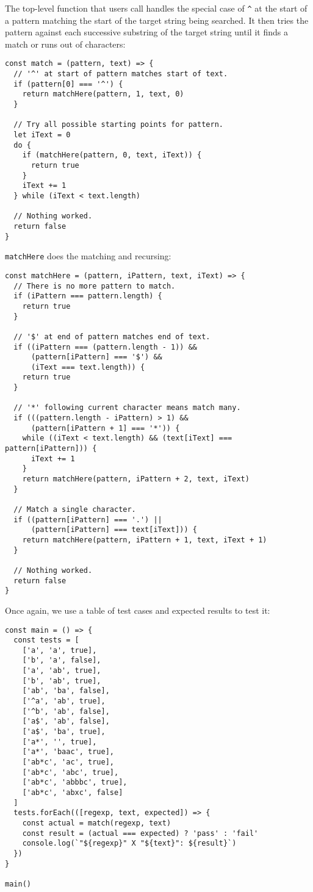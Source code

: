 \documentclass[krantzl]{krantz}
\begin{document}
The top-level function that users call
handles the special case of \texttt{{\textasciicircum}} at the start of a pattern
matching the start of the target string being searched.
It then tries the pattern against each successive substring of the target string
until it finds a match or runs out of characters:


\begin{lstlisting}[frame=tblr]
const match = (pattern, text) => {
  // '^' at start of pattern matches start of text.
  if (pattern[0] === '^') {
    return matchHere(pattern, 1, text, 0)
  }

  // Try all possible starting points for pattern.
  let iText = 0
  do {
    if (matchHere(pattern, 0, text, iText)) {
      return true
    }
    iText += 1
  } while (iText < text.length)

  // Nothing worked.
  return false
}
\end{lstlisting}



\texttt{matchHere} does the matching and recursing:


\begin{lstlisting}[frame=tblr]
const matchHere = (pattern, iPattern, text, iText) => {
  // There is no more pattern to match.
  if (iPattern === pattern.length) {
    return true
  }

  // '$' at end of pattern matches end of text.
  if ((iPattern === (pattern.length - 1)) &&
      (pattern[iPattern] === '$') &&
      (iText === text.length)) {
    return true
  }

  // '*' following current character means match many.
  if (((pattern.length - iPattern) > 1) &&
      (pattern[iPattern + 1] === '*')) {
    while ((iText < text.length) && (text[iText] === pattern[iPattern])) {
      iText += 1
    }
    return matchHere(pattern, iPattern + 2, text, iText)
  }

  // Match a single character.
  if ((pattern[iPattern] === '.') ||
      (pattern[iPattern] === text[iText])) {
    return matchHere(pattern, iPattern + 1, text, iText + 1)
  }

  // Nothing worked.
  return false
}
\end{lstlisting}



Once again,
we use a table of test cases and expected results to test it:


\begin{lstlisting}[frame=tblr]
const main = () => {
  const tests = [
    ['a', 'a', true],
    ['b', 'a', false],
    ['a', 'ab', true],
    ['b', 'ab', true],
    ['ab', 'ba', false],
    ['^a', 'ab', true],
    ['^b', 'ab', false],
    ['a$', 'ab', false],
    ['a$', 'ba', true],
    ['a*', '', true],
    ['a*', 'baac', true],
    ['ab*c', 'ac', true],
    ['ab*c', 'abc', true],
    ['ab*c', 'abbbc', true],
    ['ab*c', 'abxc', false]
  ]
  tests.forEach(([regexp, text, expected]) => {
    const actual = match(regexp, text)
    const result = (actual === expected) ? 'pass' : 'fail'
    console.log(`"${regexp}" X "${text}": ${result}`)
  })
}

main()
\end{lstlisting}
\end{document}
